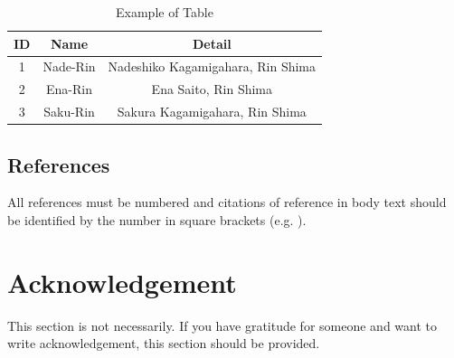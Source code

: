 \documentclass[ams]{U-AizuGT}
\begin{document}
			\begin{table}[htb]
				\caption{Example of Table}
				\label{tb:table}
				\begin{tabular}{|c|c|c|} \hline
					ID & Name & Detail \\ \hline \hline
					1 & Nade-Rin & Nadeshiko Kagamigahara, Rin Shima \\ \hline
					2 & Ena-Rin & Ena Saito, Rin Shima \\ \hline
					3 & Saku-Rin & Sakura Kagamigahara, Rin Shima \\ \hline
				\end{tabular}
			\end{table}
			
		\subsection{References}
			All references must be numbered and citations of reference in body text should be identified by the number in square brackets (e.g. \cite{graduation-thesis} \cite{fukushima-thesis} \cite{nara-nice}).

	\section*{Acknowledgement}
		This section is not necessarily. If you have gratitude for someone and want to write acknowledgement, this section should be provided.
		
	
\end{document}
